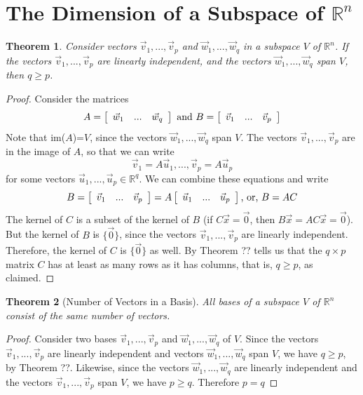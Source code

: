 \documentclass[10pt]{report}
\newtheorem{thm2}{Theorem}[section]
\begin{document}
\section{The Dimension of a Subspace of $\mathbb{R}^n$}
\begin{thm2}
Consider vectors $\vec{v}_1, ..., \vec{v}_p$ and $\vec{w}_1, ..., \vec{w}_q$ in a subspace $V$ of $\mathbb{R}^n$. If the vectors $\vec{v}_1, ..., \vec{v}_p$ are linearly independent, and the vectors $\vec{w}_1, ..., \vec{w}_q$ span $V$, then $q\geq p$.
\end{thm2}
\begin{proof}
Consider the matrices
$$A = \left[\begin{array}{c c c}
\vec{w}_1 & ... & \vec{w}_q
\end{array}\right] \text{ and } B = \left[ \begin{array}{c c c}
\vec{v}_1 & ... & \vec{v}_p
\end{array}\right]$$
Note that im($A$)=$V$, since the vectors $\vec{w}_1, ..., \vec{w}_q$ span $V$. The vectors $\vec{v}_1, ..., \vec{v}_p$ are in the image of $A$, so that we can write
$$\vec{v}_1 = A\vec{u}_1, ..., \vec{v}_p = A\vec{u}_p$$
for some vectors $\vec{u}_1, ..., \vec{u}_p\in \mathbb{R}^q$. We can combine these equations and write
$$B = \left[\begin{array}{c c c}
\vec{v}_1 & ... & \vec{v}_p
\end{array}\right] = A\left[ \begin{array}{c c c}
\vec{u}_1 & ... & \vec{u}_p
\end{array}\right]\text{, or, } B=AC$$
The kernel of $C$ is a subset of the kernel of $B$ (if $C\vec{x}=\vec{0}$, then $B\vec{x}=AC\vec{x}=\vec{0}$). But the kernel of $B$ is $\{\vec{0}\}$, since the vectors $\vec{v}_1, ..., \vec{v}_p$ are linearly independent. Therefore, the kernel of $C$ is $\{\vec{0}\}$ as well. By Theorem ?? tells us that the $q\times p$ matrix $C$ has at least as many rows as it has columns, that is, $q\geq p$, as claimed.
\end{proof}
\begin{thm2}[Number of Vectors in a Basis]
All bases of a subspace $V$ of $\mathbb{R}^n$ consist of the same number of vectors.
\end{thm2}
\begin{proof}
Consider two bases $\vec{v}_1, ..., \vec{v}_p$ and $\vec{w}_1, ..., \vec{w}_q$ of $V$. Since the vectors $\vec{v}_1, ..., \vec{v}_p$ are linearly independent and vectors $\vec{w}_1, ..., \vec{w}_q$ span $V$, we have $q\geq p$, by Theorem ??. Likewise, since the vectors $\vec{w}_1, ..., \vec{w}_q$ are linearly independent and the vectors $\vec{v}_1, ..., \vec{v}_p$ span $V$, we have $p\geq q$. Therefore $p=q$
\end{proof}
\end{document}
